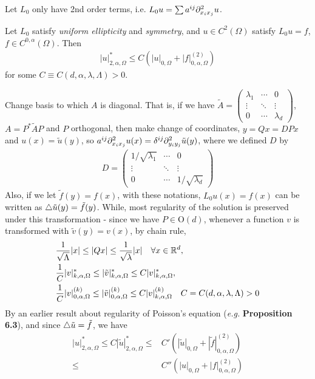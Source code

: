 \documentclass[12pt,a4paper]{article}
\newenvironment{proof}
{\begin{changemargin}{0.5cm}{0.5cm} 
	}%
	{\end{changemargin}
}
\newenvironment{p}
{\begin{proof} 
	}%
	{\end{proof}
}
\begin{document}
Let $L_0$ only have 2nd order terms, i.e. $L_0 u = \sum a^{ij} \partial^2_{x_i x_j} u$.
\s

 Let $L_0$ satisfy \emph{uniform ellipticity} and \emph{symmetry}, and $u\in C^2(\Omega)$ satisfy $L_0 u=f$, $f\in C^{0, \alpha}(\Omega)$. Then
\begin{align*}
|u|^*_{2, \alpha, \Omega} \leq C(|u|_{0, \Omega} + |f|^{(2)}_{0, \alpha, \Omega})
\end{align*}
for some $C \equiv C(d,\alpha, \lambda, \Lambda) >0$.
\begin{p}
\pf Change basis to which $A$ is diagonal. That is, if we have $\tilde{A} = \begin{pmatrix}
\lambda_1 & \cdots & 0 \\
\vdots & \ddots & \vdots \\
0 & \cdots &\lambda_d
\end{pmatrix}$, $A = P^* \tilde{A}P$ and $P$ orthogonal, then make change of coordinates, $y = Qx = DPx$ and $u(x) = \tilde{u}(y)$, so $a^{ij}\partial^2_{x_i x_j}u(x) = \delta^{ij} \partial^2_{y_i y_j} \tilde{u}(y)$, where we defined $D$ by
\begin{align*}
D = \begin{pmatrix}
1/\sqrt{\lambda_1} & \cdots & 0 \\
\vdots & \ddots & \vdots \\
0 &\cdots & 1/\sqrt{\lambda_d}
\end{pmatrix}
\end{align*}
Also, if we let $\tilde{f}(y) = f(x)$, with these notations, $L_0 u(x) = f(x)$ can be written as $\triangle \tilde{u}(y) = \tilde{f}(y)$. While, most regularity of the solution is preserved under this transformation - since we have $P \in \text{O}(d)$, whenever a function $v$ is transformed with $\tilde{v}(y) =v(x)$, by chain rule,
\begin{align*}
&\frac{1}{\sqrt{\Lambda}}|x| \leq |Qx| \leq \frac{1}{\sqrt{\lambda}}|x| \quad \forall x\in \mathbb{R}^d ,\\
&\frac{1}{C}|v|_{k, \alpha, \Omega}^* \leq |\tilde{v}|^*_{k, \alpha, \Omega}\leq C|v|^*_{k, \alpha, \Omega}, \\
&\frac{1}{C} |v|^{(k)}_{0, \alpha, \Omega} \leq |\tilde{v}|^{(k)}_{0, \alpha, \Omega} \leq C |v|^{(k)}_{k, \alpha, \Omega} \quad C= C(d,\alpha,\lambda, \Lambda) >0
\end{align*}
By an earlier result about regularity of Poisson's equation (\textit{e.g.} \textbf{Proposition 6.3}), and since $\triangle \tilde{u} = \tilde{f}$, we have
\begin{align*}
|u|^*_{2, \alpha, \Omega} \leq C|\tilde{u}|^*_{2, \alpha, \Omega} \leq & C' (|\tilde{u}|_{0, \Omega}+ |\tilde{f}|^{(2)}_{0, \alpha, \Omega}) \\
\leq & C''(|u|_{0, \Omega} + |f|^{(2)}_{0, \alpha, \Omega})
\end{align*}

\eop
\end{p}
\s
\end{document}
